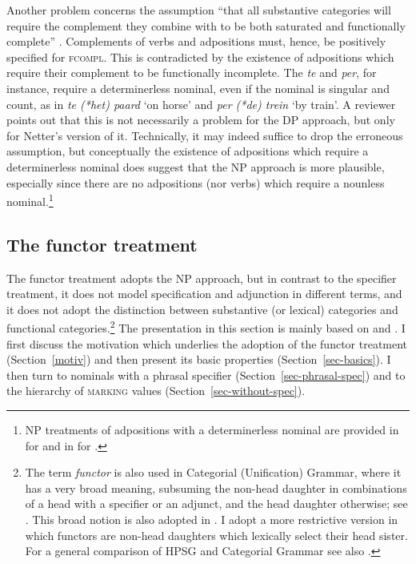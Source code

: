 \documentclass[output=paper,biblatex,babelshorthands,newtxmath,draftmode,colorlinks,citecolor=brown]{langscibook}
\begin{document}
Another problem concerns the assumption ``that all substantive categories will 
require the complement they combine with to be both saturated and functionally complete''
\citep[311]{Netter94}. Complements of verbs and adpositions must, hence, be positively 
specified for \textsc{fcompl}. This is contradicted by the existence of
adpositions which require their complement to be functionally incomplete. 
The  \emph{te} and \emph{per}, for instance, require a determinerless nominal,
even if the nominal is singular and count, as in \emph{te (*het) paard} `on horse' 
and \emph{per (*de) trein} `by train'. A reviewer points out that this is 
not necessarily a problem for the DP approach, but only for Netter's version of it. 
Technically, it may indeed suffice to drop the erroneous assumption, but 
conceptually the existence of adpositions which require a determinerless nominal 
does suggest that the NP approach is more plausible, especially since 
there are no adpositions (nor verbs) which require a nounless nominal.\footnote{NP 
treatments of adpositions with a determinerless nominal are provided in 
\citet{VanEynde04} for  and in \citet{Kiss2008a-u} for .}    


\subsection{The functor treatment} 
\label{funct}\label{np:sec-functor-treatment}

\largerpage\enlargethispage{3pt}
The functor treatment adopts the NP approach, but in contrast to the specifier treatment,  
it does not model specification and adjunction in different terms, and it does not adopt 
the distinction between substantive (or lexical) categories and functional 
categories.\footnote{The term \emph{functor} is also used in Categorial (Unification) Grammar, 
where it has a very broad meaning, subsuming the non-head daughter in combinations of a 
head with a specifier or an adjunct, and the head daughter otherwise;
see \citet{Bouma88}. This broad notion is also adopted in 
\citet{Reape94}. I adopt a more restrictive version in which functors 
are non-head daughters which lexically select their head sister. For a general comparison of
HPSG and Categorial Grammar see also .}  
The presentation in this section is mainly based on \citet{VanEynde06} 
and \citet{Allegranza06}. I first discuss the motivation which underlies the adoption 
of the functor treatment (Section~\ref{motiv}) and then present its basic
properties (Section~\ref{sec-basics}). I then turn to nominals with a 
phrasal specifier (Section~\ref{sec-phrasal-spec}) 
and to the hierarchy of \textsc{marking} values (Section~\ref{sec-without-spec}).    
\end{document}
